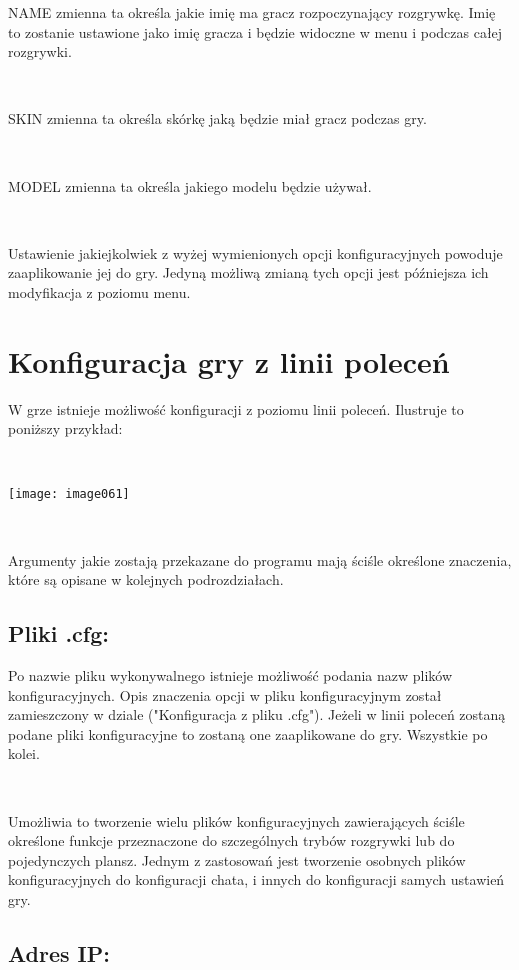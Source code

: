 \documentclass[licencjacka]{pracamgr}
\begin{document}
NAME zmienna ta określa jakie imię ma gracz rozpoczynający rozgrywkę. Imię to zostanie ustawione jako imię gracza i będzie widoczne w menu i podczas całej rozgrywki.

\ \

SKIN zmienna ta określa skórkę jaką będzie miał gracz podczas gry.

\ \

MODEL zmienna ta określa jakiego modelu będzie używał.

\ \

Ustawienie jakiejkolwiek z wyżej wymienionych opcji konfiguracyjnych powoduje zaaplikowanie jej do gry. Jedyną możliwą zmianą tych opcji jest późniejsza ich modyfikacja z poziomu menu.

\section{Konfiguracja gry z linii poleceń}

W grze istnieje możliwość konfiguracji z poziomu linii poleceń. Ilustruje to poniższy przykład:

\ \

\begin{center}
\texttt{[image: image061]}
\end{center}

\ \

Argumenty jakie zostają przekazane do programu mają ściśle określone znaczenia, które są opisane w
kolejnych podrozdziałach.

\subsection{Pliki .cfg:}

Po nazwie pliku wykonywalnego istnieje możliwość podania nazw plików konfiguracyjnych.
Opis znaczenia opcji w pliku konfiguracyjnym został zamieszczony w dziale ("Konfiguracja z pliku .cfg"). Jeżeli w linii poleceń zostaną podane pliki konfiguracyjne to zostaną one zaaplikowane do gry. Wszystkie po kolei.

\ \

Umożliwia to tworzenie wielu plików konfiguracyjnych zawierających ściśle określone funkcje przeznaczone do szczególnych trybów rozgrywki lub do pojedynczych plansz.
Jednym z zastosowań jest tworzenie osobnych plików konfiguracyjnych do konfiguracji chata, i innych do konfiguracji samych ustawień gry.

\subsection{Adres IP:}
\end{document}
